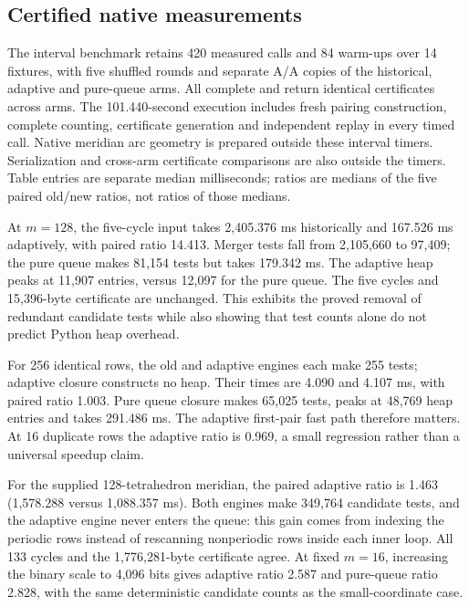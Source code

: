 \subsection{Certified native measurements}

The interval benchmark retains 420 measured calls and 84 warm-ups over
14 fixtures, with five shuffled rounds and separate A/A copies of the
historical, adaptive and pure-queue arms. All complete and return identical
certificates across arms. The 101.440-second execution includes fresh pairing
construction, complete counting, certificate generation and independent replay
in every timed call. Native meridian arc geometry is prepared outside these
interval timers. Serialization and cross-arm certificate comparisons are also
outside the timers. Table entries are separate median milliseconds; ratios
are medians of the five paired old/new ratios, not ratios of those medians.



At $m=128$, the five-cycle input takes 2,405.376 ms historically and
167.526 ms adaptively, with paired ratio 14.413. Merger tests fall from
2,105,660 to 97,409; the pure queue makes 81,154 tests but takes 179.342 ms.
The adaptive heap peaks at 11,907 entries, versus 12,097 for the pure queue.
The five cycles and 15,396-byte certificate are unchanged. This exhibits the
proved removal of redundant candidate tests while also showing that test
counts alone do not predict Python heap overhead.

For 256 identical rows, the old and adaptive engines each make 255 tests;
adaptive closure constructs no heap. Their times are 4.090 and 4.107 ms,
with paired ratio 1.003. Pure queue closure makes 65,025 tests, peaks at
48,769 heap entries and takes 291.486 ms. The adaptive first-pair fast path
therefore matters. At 16 duplicate rows the adaptive ratio is 0.969, a small
regression rather than a universal speedup claim.

For the supplied 128-tetrahedron meridian, the paired adaptive ratio is
1.463 (1,578.288 versus 1,088.357 ms). Both engines make 349,764 candidate
tests, and the adaptive engine never enters the queue: this gain comes from
indexing the periodic rows instead of rescanning nonperiodic rows inside each
inner loop. All 133 cycles and the 1,776,281-byte certificate agree. At fixed
$m=16$, increasing the binary scale to 4,096 bits gives adaptive ratio 2.587
and pure-queue ratio 2.828, with the same deterministic candidate counts as
the small-coordinate case.

